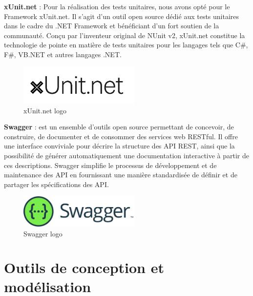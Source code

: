 \textbf{xUnit.net} : Pour la réalisation des tests unitaires, nous avons opté pour le Framework xUnit.net. Il s'agit d'un outil open source dédié aux tests unitaires dans le cadre du .NET Framework et bénéficiant d'un fort soutien de la communauté. Conçu par l'inventeur original de NUnit v2, xUnit.net constitue la technologie de pointe en matière de tests unitaires pour les langages tels que C\#, F\#, VB.NET et autres langages .NET.
\\
\begin{figure}[H] 
    \centering
    \includegraphics[width=6cm]{Figures/xunitlogo.png}
        \caption{xUnit.net logo}
\end{figure}


\textbf{Swagger} : est un ensemble d'outils open source permettant de concevoir, de construire, de documenter et de consommer des services web RESTful. Il offre une interface conviviale pour décrire la structure des API REST, ainsi que la possibilité de générer automatiquement une documentation interactive à partir de ces descriptions. Swagger simplifie le processus de développement et de maintenance des API en fournissant une manière standardisée de définir et de partager les spécifications des API.
\\
\begin{figure}[H] 
    \centering
    \includegraphics[width=6cm]{Figures/swaggerlogo.png}
        \caption{Swagger logo}
\end{figure}



\section{Outils de conception et modélisation}


